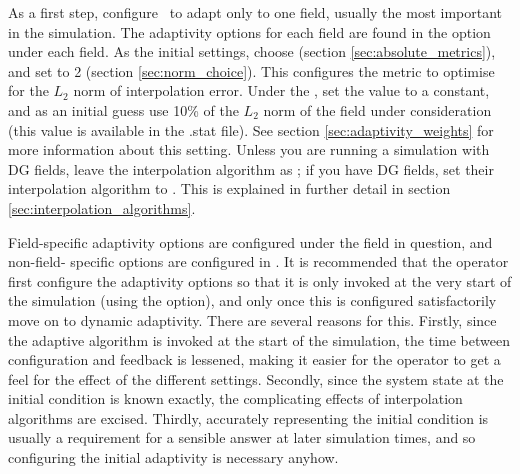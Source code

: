 As a first step, configure \fluidity\ to adapt only to one field, usually the most
important in the simulation. The adaptivity options for each field are found in the
 option under each field. As the initial settings,
choose  (section \ref{sec:absolute_metrics}), and set 
to 2 (section \ref{sec:norm_choice}). This configures the metric to optimise for the $L_2$ norm
of interpolation error. Under the , set the value to a constant,
and as an initial guess use 10\% of the $L_2$ norm of the field under consideration (this
value is available in the .stat file). See section \ref{sec:adaptivity_weights} for more information
about this setting. Unless you are running a simulation with DG fields, leave the interpolation
algorithm as ; if you have DG fields, set their interpolation
algorithm to . This is explained in further detail in section \ref{sec:interpolation_algorithms}.

Field-specific adaptivity options are configured under the field in question, and non-field-
specific options are configured in . It is recommended
that the operator first configure the adaptivity options so that it is only invoked at the
very start of the simulation (using the  option), and only once this is configured satisfactorily move on to dynamic adaptivity. There are several reasons for this. Firstly, since the adaptive algorithm is invoked
at the start of the simulation, the time between configuration and feedback is lessened, making it
easier for the operator to get a feel for the effect of the different settings. Secondly, since the
system state at the initial condition is known exactly, the complicating effects of interpolation
algorithms are excised. Thirdly, accurately representing the initial condition is usually a requirement
for a sensible answer at later simulation times, and so configuring the initial adaptivity is
necessary anyhow.

